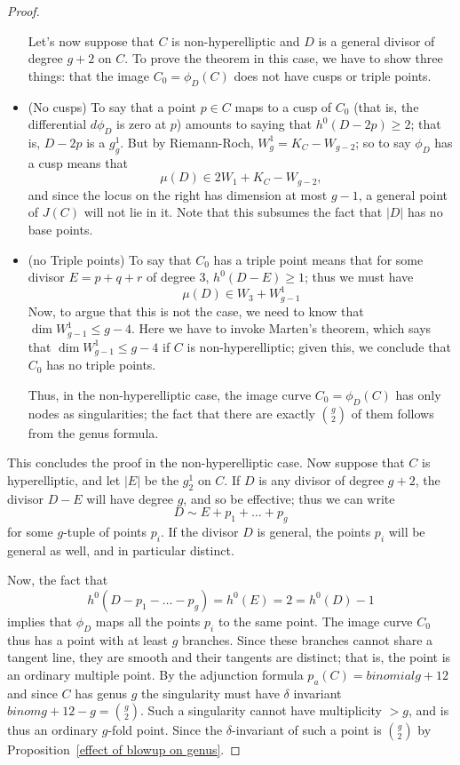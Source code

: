 \begin{proof}
\begin{itemize}
Let's now suppose that $C$ is non-hyperelliptic and $D$ is a general divisor of degree $g+2$ on $C$. To prove the theorem in this case, we have to show  three things: that the image $C_0 = \phi_D(C)$ does not have cusps or triple points.

\item (No cusps) To say that a point $p \in C$ maps to a cusp of $C_0$ (that is, the differential $d\phi_D$ is zero at $p$) amounts to saying that $h^0(D-2p) \geq 2$; that is, $D-2p$ is a $g^1_g$. But by Riemann-Roch, $W^1_g = K_C - W_{g-2}$; so to say $\phi_D$ has a cusp means that
$$
\mu(D) \in 2W_1 + K_C - W_{g-2},
$$
and since the locus on the right has dimension at most $g-1$, a general point of $J(C)$ will not lie in it. Note that this subsumes the fact that $|D|$ has no base points.

\item (no Triple points) To say that $C_0$ has a triple point means that for some divisor $E = p+q+r$ of degree 3, $h^0(D-E) \geq 1$; thus we must have 
$$
\mu(D) \in W_3 + W^1_{g-1}
$$
Now, to argue that this is not the case, we need to know that $\dim W^1_{g-1} \leq g-4$. Here we have to invoke Marten's theorem, which says that $\dim W^1_{g-1} \leq g-4$ if $C$ is non-hyperelliptic; given this, we conclude that $C_0$ has no triple points.


Thus, in the non-hyperelliptic case, the image curve $C_0 = \phi_D(C)$ has only nodes as singularities; the fact that there are exactly $\binom{g}{2}$ of them follows from the genus formula.
\end{itemize}

\noindent This concludes the proof in the non-hyperelliptic case. Now suppose that $C$ is hyperelliptic, and let $|E|$ be the  $g^1_2$ on $C$. If  $D$ is any divisor of degree $g+2$, the divisor $D - E$ will have degree $g$, and so be effective; thus we can write
$$
D \sim E + p_1 + \dots + p_g
$$
for some $g$-tuple of points $p_i$. If the divisor $D$ is general, the points $p_i$ will be general as well, and in particular distinct.

Now, the fact that
$$
h^0(D - p_1 - \dots - p_g) = h^0(E) = 2 = h^0(D) - 1
$$
implies that $\phi_D$ maps all the points $p_i$ to the same point. The image curve $C_0$ thus has a point with at least $g$ branches. Since these branches cannot share a tangent line,
they are smooth and their tangents are distinct; that is, the point is an ordinary multiple point. By the adjunction
formula $p_a(C) = binomial{g+1}{2}$ and since $C$ has genus $g$ the singularity must have $\delta$ invariant
$binom{g+1}{2} -g = \binom{g}{2}$. Such a singularity cannot have multiplicity $>g$, and is thus an ordinary $g$-fold point. Since the $\delta$-invariant of such a point is $\binom{g}{2}$ by Proposition~\ref{effect of blowup on genus}.
\end{proof}







